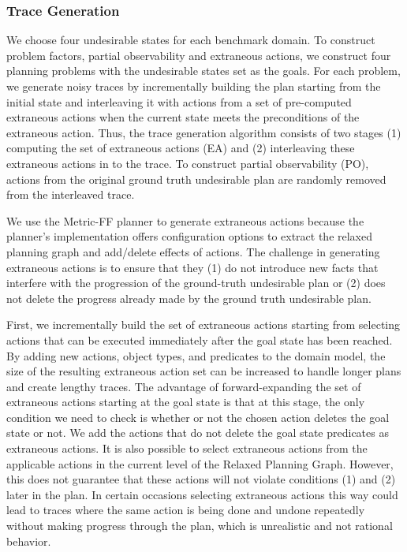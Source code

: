 \subsubsection{Trace Generation}
We choose four undesirable states for each benchmark domain.
To construct problem factors, partial observability and extraneous actions, we construct four planning problems with the undesirable states set as the goals. 
For each problem, we generate noisy traces by incrementally building the plan starting from the initial state and interleaving it with actions from a set of pre-computed extraneous actions when the current state meets the preconditions of the extraneous action. 
Thus, the trace generation algorithm consists of two stages (1) computing the set of extraneous actions (EA) and (2) interleaving these extraneous actions in to the trace. 
To construct partial observability (PO), actions from the original ground truth 
undesirable plan are randomly removed from the interleaved trace.

We use the Metric-FF planner \cite{hoffman2003ff} to generate extraneous actions because the planner's implementation offers configuration options to extract the relaxed planning graph and add/delete effects of actions. 
The challenge in generating extraneous actions is to ensure that they (1) do not introduce new facts that interfere with the progression of the ground-truth undesirable plan  or (2) does not delete the progress already made by the ground truth undesirable plan. 

First, we incrementally build the set of extraneous actions starting from selecting actions that can be executed immediately after the goal state has been reached. 
By adding new actions, object types, and predicates to the domain model, the size of the resulting extraneous action set can be increased to handle longer plans and create lengthy traces. 
The advantage of forward-expanding the set of extraneous actions starting at the goal state is that at this stage, the only condition we need to check is whether or not the chosen action deletes the goal state or not.
We add the actions that do not delete the goal state predicates as extraneous actions. 
It is also possible to select extraneous actions from the applicable actions in the current level of the Relaxed Planning Graph.
However, this does not guarantee that these actions will not violate conditions (1) and (2) later in the plan. 
In certain occasions selecting extraneous actions this way could lead to traces where the same action is being done and undone repeatedly without making progress through the plan, which is unrealistic and not rational behavior.

